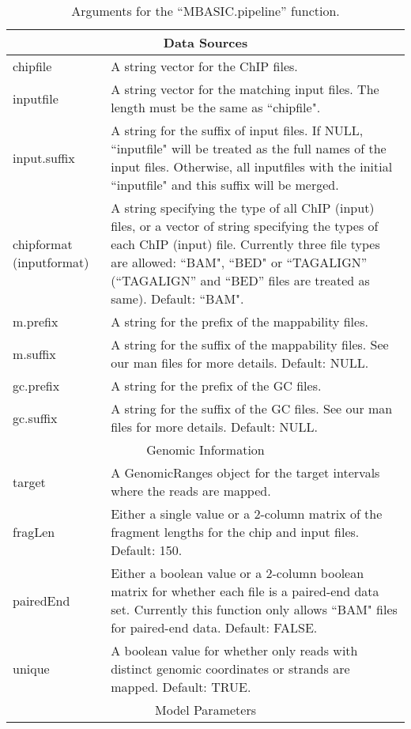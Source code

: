 \documentclass[a4paper,10pt]{article}
\begin{document}
\begin{table}
  \centering
  \caption{Arguments for the ``MBASIC.pipeline'' function.}\label{tbl:arguments}
  \begin{tabular}{p{2cm}p{10cm}}
    \hline
    \multicolumn{2}{c}{Data Sources}\\
    \hline
    chipfile & A string vector for the ChIP files.\\
    inputfile & A string vector for the matching input files. The length must be the same as ``chipfile".\\
    input.suffix & A string for the suffix of input files. If NULL, ``inputfile" will be treated as the full names of the input files. Otherwise, all inputfiles with the initial ``inputfile" and this suffix will be merged.\\
    chipformat (inputformat) & A string specifying the type of all ChIP (input) files, or a vector of string specifying the types of each ChIP (input) file.  Currently three file types are allowed: ``BAM", ``BED" or ``TAGALIGN'' (``TAGALIGN'' and ``BED'' files are treated as same).  Default: ``BAM".\\
    m.prefix & A string for the prefix of the mappability files.\\
    m.suffix & A string for the suffix of the mappability files. See our man files for more details.  Default: NULL.\\
    gc.prefix & A string for the prefix of the GC files.\\
    gc.suffix & A string for the suffix of the GC files.  See our man files for more details. Default: NULL.\\
    \hline
    \multicolumn{2}{c}{Genomic Information}\\
    \hline
    target & A GenomicRanges object for the target intervals where the reads are mapped.\\
    fragLen & Either a single value or a 2-column matrix of the fragment lengths for the chip and input files.  Default: 150.\\
    pairedEnd & Either a boolean value or a 2-column boolean matrix for  whether each file is a paired-end data set. Currently this function only allows ``BAM" files for paired-end data. Default: FALSE.\\
    unique & A boolean value for whether only reads with distinct genomic coordinates or strands are mapped.  Default: TRUE.\\
    \hline
    \multicolumn{2}{c}{Model Parameters}\\

\end{tabular}
\end{table}
\end{document}
